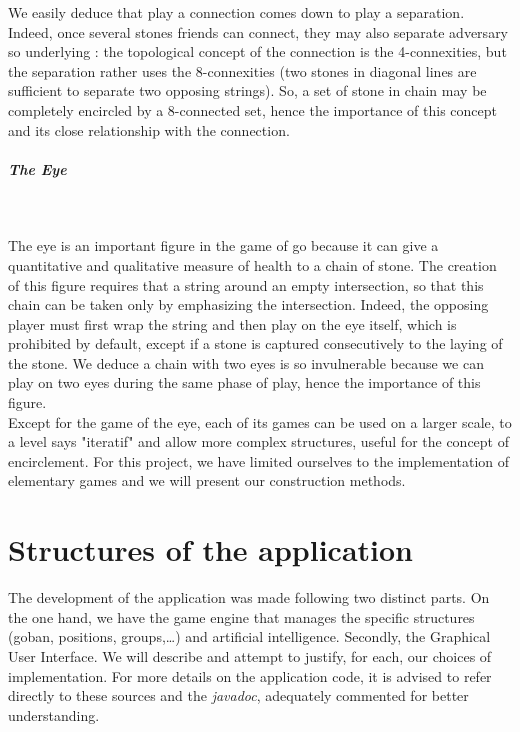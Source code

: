 \documentclass[a4paper,10pt,twoside]{report}
\begin{document}
	We easily deduce that play a connection comes down to play a separation. Indeed, once several stones friends can connect, they may also separate adversary so underlying : the topological concept of the connection is the 4-connexities, but the separation rather uses the 8-connexities (two stones in diagonal lines are sufficient to separate two opposing strings). So, a set of stone in chain may be completely encircled by a 8-connected set, hence the importance of this concept and its close relationship with the connection.

	\paragraph{The Eye}
	~~\vspace{2mm}

	The eye is an important figure in the game of go because it can give a quantitative and qualitative measure of health to a chain of stone. The creation of this figure requires that a string around an empty intersection, so that this chain can be taken only by emphasizing the intersection. Indeed, the opposing player must first wrap the string and then play on the eye itself, which is prohibited by default, except if a stone is captured consecutively to the laying of the stone. We deduce a chain with two eyes is so invulnerable because we can play on two eyes during the same phase of play, hence the importance of this figure.\\

	Except for the game of the eye, each of its games can be used on a larger scale, to a level says "iteratif" and allow more complex structures, useful for the concept of encirclement. For this project, we have limited ourselves to the implementation of elementary games and we will present our construction methods.


\chapter{Structures of the application}


	The development of the application was made following two distinct parts. On the one hand, we have the game engine that manages the specific structures (goban, positions, groups,\ldots) and artificial intelligence. Secondly, the Graphical User Interface. We will describe and attempt to justify, for each, our choices of implementation. For more details on the application code, it is advised to refer directly to these sources and the  \emph{javadoc}, adequately commented for better understanding.
\end{document}

